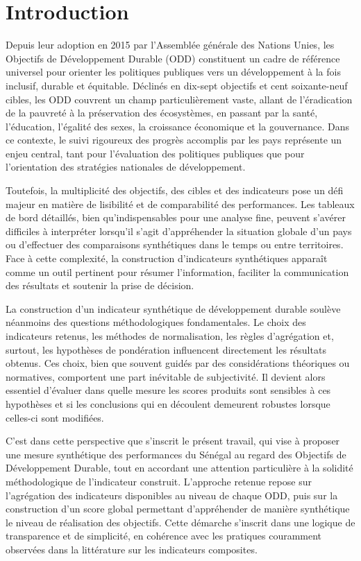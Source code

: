 \chapter*{Introduction}

Depuis leur adoption en 2015 par l’Assemblée générale des Nations Unies, les Objectifs de Développement Durable (ODD) constituent un cadre de référence universel pour orienter les politiques publiques vers un développement à la fois inclusif, durable et équitable. Déclinés en dix-sept objectifs et cent soixante-neuf cibles, les ODD couvrent un champ particulièrement vaste, allant de l’éradication de la pauvreté à la préservation des écosystèmes, en passant par la santé, l’éducation, l’égalité des sexes, la croissance économique et la gouvernance. Dans ce contexte, le suivi rigoureux des progrès accomplis par les pays représente un enjeu central, tant pour l’évaluation des politiques publiques que pour l’orientation des stratégies nationales de développement.

Toutefois, la multiplicité des objectifs, des cibles et des indicateurs pose un défi majeur en matière de lisibilité et de comparabilité des performances. Les tableaux de bord détaillés, bien qu’indispensables pour une analyse fine, peuvent s’avérer difficiles à interpréter lorsqu’il s’agit d’appréhender la situation globale d’un pays ou d’effectuer des comparaisons synthétiques dans le temps ou entre territoires. Face à cette complexité, la construction d’indicateurs synthétiques apparaît comme un outil pertinent pour résumer l’information, faciliter la communication des résultats et soutenir la prise de décision.

La construction d’un indicateur synthétique de développement durable soulève néanmoins des questions méthodologiques fondamentales. Le choix des indicateurs retenus, les méthodes de normalisation, les règles d’agrégation et, surtout, les hypothèses de pondération influencent directement les résultats obtenus. Ces choix, bien que souvent guidés par des considérations théoriques ou normatives, comportent une part inévitable de subjectivité. Il devient alors essentiel d’évaluer dans quelle mesure les scores produits sont sensibles à ces hypothèses et si les conclusions qui en découlent demeurent robustes lorsque celles-ci sont modifiées.

C’est dans cette perspective que s’inscrit le présent travail, qui vise à proposer une mesure synthétique des performances du Sénégal au regard des Objectifs de Développement Durable, tout en accordant une attention particulière à la solidité méthodologique de l’indicateur construit. L’approche retenue repose sur l’agrégation des indicateurs disponibles au niveau de chaque ODD, puis sur la construction d’un score global permettant d’appréhender de manière synthétique le niveau de réalisation des objectifs. Cette démarche s’inscrit dans une logique de transparence et de simplicité, en cohérence avec les pratiques couramment observées dans la littérature sur les indicateurs composites.

